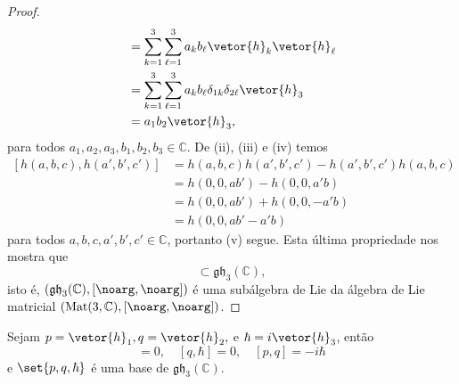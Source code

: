 \begin{proof}
\begin{align*}
                                      &= \sum_{k = 1}^3 \sum_{\ell = 1}^3 a_k b_\ell \vetor{h}_k \vetor{h}_\ell\\
                                      &= \sum_{k = 1}^3\sum_{\ell = 1}^3 a_k b_\ell \delta_{1k} \delta_{2\ell} \vetor{h}_3\\
                                      &= a_1 b_2 \vetor{h}_3,
    \end{align*}
    para todos \(a_1,a_2,a_3, b_1,b_2,b_3 \in \mathbb{C}\). De (ii), (iii) e (iv) temos
    \begin{align*}
        \left[h(a,b,c),h(a',b',c')\right] &= h(a,b,c) h(a',b',c') - h(a', b', c') h(a,b,c)\\
                                          &= h(0,0,ab') - h(0,0,a'b) \\
                                          &= h(0,0,ab') + h(0,0,-a'b) \\
                                          &= h(0,0,ab' - a'b)
    \end{align*}
    para todos \(a,b,c,a',b',c' \in \mathbb{C}\), portanto (v) segue. Esta última propriedade nos mostra que
    \begin{equation*}
        [\mathfrak{gh}_3(\mathbb{C}), \mathfrak{gh}_3(\mathbb{C})] \subset \mathfrak{gh}_3(\mathbb{C}),
    \end{equation*}
    isto é, \(\left(\mathfrak{gh}_3(\mathbb{C}), [\noarg,\noarg]\right)\) é uma subálgebra de Lie da álgebra de Lie matricial \(\left(\mathrm{Mat}(3, \mathbb{C}), [\noarg, \noarg]\right)\).
\end{proof}
\begin{corollary}
    Sejam \(p = \vetor{h}_1, q = \vetor{h}_2,\) e \(\hbar = i\vetor{h}_3\), então
    \begin{equation*}
        [p,\hbar] = 0,\quad
        [q,\hbar] = 0,\quad
        [p,q] = -i\hbar
    \end{equation*}
    e \(\set{p,q,\hbar}\) é uma base de \(\mathfrak{gh}_3(\mathbb{C})\).
\end{corollary}
